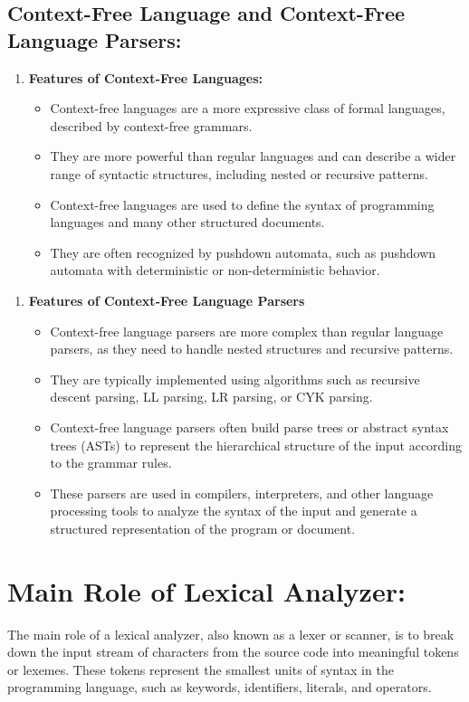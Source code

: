 \documentclass{article}
\begin{document}
\subsection{Context-Free Language and Context-Free Language Parsers:}
\begin{enumerate}
\item \textbf{Features of Context-Free Languages:}
\begin{itemize}
   \item Context-free languages are a more expressive class of formal languages, described by context-free grammars.
            \item They are more powerful than regular languages and can describe a wider range of syntactic structures, including nested or recursive patterns.
            \item Context-free languages are used to define the syntax of programming languages and many other structured documents.
            \item They are often recognized by pushdown automata, such as pushdown automata with deterministic or non-deterministic behavior.
        
\end{itemize}

\end{enumerate}
\begin{enumerate}
\item \textbf{Features of Context-Free Language Parsers}
\begin{itemize}
 \item Context-free language parsers are more complex than regular language parsers, as they need to handle nested structures and recursive patterns.
            \item They are typically implemented using algorithms such as recursive descent parsing, LL parsing, LR parsing, or CYK parsing.
            \item Context-free language parsers often build parse trees or abstract syntax trees (ASTs) to represent the hierarchical structure of the input according to the grammar rules.
            \item These parsers are used in compilers, interpreters, and other language processing tools to analyze the syntax of the input and generate a structured representation of the program or document.
        
\end{itemize}
\end{enumerate}
\section{Main Role of Lexical Analyzer:}
The main role of a lexical analyzer, also known as a lexer or scanner, is to break down the input stream of characters from the source code into meaningful tokens or lexemes. These tokens represent the smallest units of syntax in the programming language, such as keywords, identifiers, literals, and operators.
\end{document}
